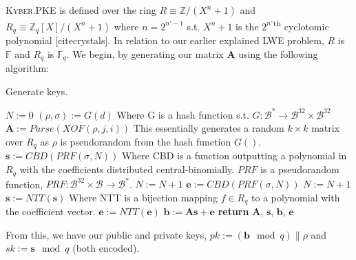 \documentclass[a4paper, 10pt]{article}
\theoremstyle{definition}
\begin{document}
\textsc{Kyber}.PKE is defined over the ring $R \equiv \mathbb{Z} /(X^n+1)$ and $R_q\equiv \mathbb{Z}_q[X]/(X^n+1)$ where $n=2^{n'-1}$ s.t. $X^{n}+1$ is the $2^{n'}$\textsuperscript{th} cyclotomic polynomial [citecrystals]. In relation to our earlier explained LWE problem, $R$ is $\mathbb{F}$ and $R_q$ is $\mathbb{F}_q$. We begin, by generating our matrix $\mathbf{A}$ using the following algorithm:
\begin{algorithm}[H]
    \caption{Generate keys.}
    \begin{algorithmic}
    \State $N:=0$
    \State $(\rho, \sigma ):=G(d)$ \Comment Where G is a hash function s.t. $G:\mathcal{B}^* \rightarrow \mathcal{B}^{32}\times  \mathcal{B}^{32}$
            \State $\mathbf{A}:=Parse(XOF(\rho , j, i))$ \Comment This essentially generates a random $k\times k$ matrix over $R_q$ as $\rho$ is pseudorandom from the hash function $G()$.
        \EndFor
    \EndFor
        \State $\mathbf{s}:=CBD(PRF(\sigma ,N))$ \Comment Where CBD is a function outputting a polynomial in $R_q$ with the coefficients distributed central-binomially. $PRF$ is a pseudorandom function, $PRF:\mathcal{B}^{32} \times \mathcal{B} \rightarrow \mathcal{B}^*$.
        \State $N:=N+1$
    \EndFor
        \State $\mathbf{e}:=CBD(PRF(\sigma ,N))$
        \State $N:=N+1$
    \EndFor
    \State $\mathbf{s}:= NTT(\mathbf{s})$ \Comment Where NTT is a bijection mapping $f \in R_q$ to a polynomial with the coefficient vector.
    \State $\mathbf{e}:= NTT(\mathbf{e})$
    \State $\mathbf{b}:=\mathbf{As}+\mathbf{e}$
    \State \textbf{return} $\mathbf{A}$, $\mathbf{s}$, $\mathbf{b}$, $\mathbf{e}$
    \end{algorithmic}
\end{algorithm}

From this, we have our public and private keys, $pk:=(\mathbf{b}\mod{q})\| \rho $ and $sk:=\mathbf{s}\mod{q}$ (both encoded).
\end{document}
